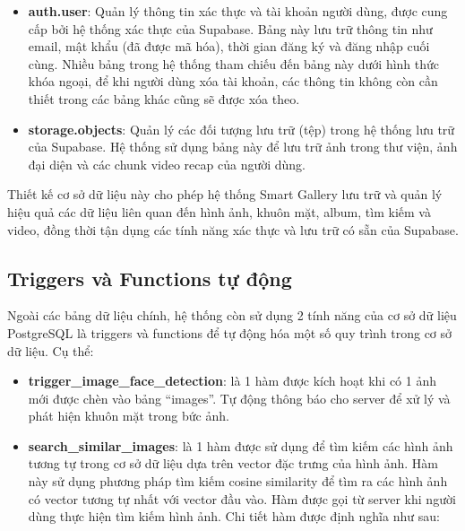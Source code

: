 \begin{itemize}
    \item \textbf{auth.user}: Quản lý thông tin xác thực và tài khoản người dùng, được cung cấp bởi hệ thống xác thực của Supabase. Bảng này lưu trữ thông tin như email, mật khẩu (đã được mã hóa), thời gian đăng ký và đăng nhập cuối cùng. Nhiều bảng trong hệ thống tham chiếu đến bảng này dưới hình thức khóa ngoại, để khi người dùng xóa tài khoản, các thông tin không còn cần thiết trong các bảng khác cũng sẽ được xóa theo.
    
    \item \textbf{storage.objects}: Quản lý các đối tượng lưu trữ (tệp) trong hệ thống lưu trữ của Supabase. Hệ thống sử dụng bảng này để lưu trữ ảnh trong thư viện, ảnh đại diện và các chunk video recap của người dùng.
\end{itemize}

Thiết kế cơ sở dữ liệu này cho phép hệ thống Smart Gallery lưu trữ và quản lý hiệu quả các dữ liệu liên quan đến hình ảnh, khuôn mặt, album, tìm kiếm và video, đồng thời tận dụng các tính năng xác thực và lưu trữ có sẵn của Supabase.

\subsection{Triggers và Functions tự động}

Ngoài các bảng dữ liệu chính, hệ thống còn sử dụng 2 tính năng của cơ sở dữ liệu PostgreSQL là triggers và functions để tự động hóa một số quy trình trong cơ sở dữ liệu. Cụ thể:
\begin{itemize}
    \item \textbf{trigger\_image\_face\_detection}: là 1 hàm được kích hoạt khi có 1 ảnh mới được chèn vào bảng ``images''. Tự động thông báo cho server để xử lý và phát hiện khuôn mặt trong bức ảnh.
    
    
    \item \textbf{search\_similar\_images}: là 1 hàm được sử dụng để tìm kiếm các hình ảnh tương tự trong cơ sở dữ liệu dựa trên vector đặc trưng của hình ảnh. Hàm này sử dụng phương pháp tìm kiếm cosine similarity để tìm ra các hình ảnh có vector tương tự nhất với vector đầu vào. Hàm được gọi từ server khi người dùng thực hiện tìm kiếm hình ảnh.  Chi tiết hàm được định nghĩa như sau:
      
    
\end{itemize}

